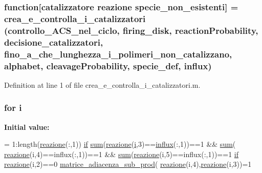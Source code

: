 \hypertarget{a00056_a5e47fda8cc2a1711ddabe11a14ba8ecb}{
\subsubsection[{function}]{\setlength{\rightskip}{0pt plus 5cm}function\mbox{[}{\bf catalizzatore} {\bf reazione} {\bf specie\-\_\-non\-\_\-esistenti}\mbox{]} = {\bf crea\-\_\-e\-\_\-controlla\-\_\-i\-\_\-catalizzatori} (controllo\-\_\-\-A\-C\-S\-\_\-nel\-\_\-ciclo, {\bf firing\-\_\-disk}, {\bf reaction\-Probability}, {\bf decisione\-\_\-catalizzatori}, {\bf fino\-\_\-a\-\_\-che\-\_\-lunghezza\-\_\-i\-\_\-polimeri\-\_\-non\-\_\-catalizzano}, {\bf alphabet}, {\bf cleavage\-Probability}, {\bf specie\-\_\-def}, {\bf influx})}}\label{a00056_a5e47fda8cc2a1711ddabe11a14ba8ecb}


Definition at line 1 of file crea\-\_\-e\-\_\-controlla\-\_\-i\-\_\-catalizzatori.\-m.

\hypertarget{a00056_a6f6ccfcf58b31cb6412107d9d5281426}{
\subsubsection[{i}]{\setlength{\rightskip}{0pt plus 5cm}for i}}\label{a00056_a6f6ccfcf58b31cb6412107d9d5281426}
{\bfseries Initial value\-:}
\begin{DoxyCode}
= 1:length(\hyperlink{a00054_a84d78e886b9f683403579e3911e7f046}{reazione}(:,1))
                \hyperlink{a00019_adf3394dfd4755fd0ef2854fe558ff8aa}{if} \hyperlink{a00022_a576bebae86b11914280920c448def53d}{sum}(\hyperlink{a00054_a84d78e886b9f683403579e3911e7f046}{reazione}(\hyperlink{a00021_a1de1a45bc56b002aa1ad94bb5f54a1ca}{i},3)==\hyperlink{a00022_a637d2af7e7b03600bcaf1931b999e3fc}{influx}(:,1))==1 && \hyperlink{a00022_a576bebae86b11914280920c448def53d}{sum}(
      \hyperlink{a00054_a84d78e886b9f683403579e3911e7f046}{reazione}(i,4)==influx(:,1))==1 && \hyperlink{a00022_a576bebae86b11914280920c448def53d}{sum}(\hyperlink{a00054_a84d78e886b9f683403579e3911e7f046}{reazione}(i,5)==influx(:,1))==1
                    \hyperlink{a00019_adf3394dfd4755fd0ef2854fe558ff8aa}{if} \hyperlink{a00054_a84d78e886b9f683403579e3911e7f046}{reazione}(i,2)==0                        
                        \hyperlink{a00056_a75ff61c394ad5be40e5084b8b794e2b2}{matrice\_adiacenza\_sub\_prod}(
      \hyperlink{a00054_a84d78e886b9f683403579e3911e7f046}{reazione}(i,4),\hyperlink{a00054_a84d78e886b9f683403579e3911e7f046}{reazione}(i,3))=1
\end{DoxyCode}


